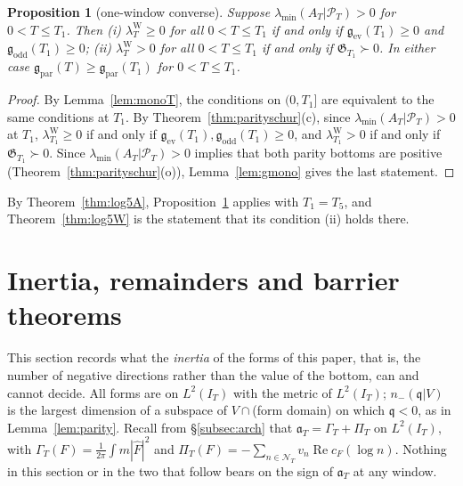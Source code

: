 \documentclass[11pt]{amsart}
\newtheorem{proposition}[theorem]{Proposition}
\theoremstyle{definition}
\theoremstyle{remark}
\newcommand{\Rel}{\operatorname{Re}}
\newcommand{\PT}{\mathcal P_T}
\newcommand{\IT}{I_T}
\newcommand{\lamW}{\lambda^{\mathrm W}_T}
\newcommand{\lamA}{\lambda_{\min}(A_T|\PT)}
\newcommand{\Fh}{\widehat F}
\newcommand{\cF}{c_F}
\newcommand{\NT}{\mathcal N_T}
\newcommand{\PiT}{\Pi_T}
\begin{document}
\begin{proposition}[one-window converse]\label{prop:onewindow}
Suppose $\lamA>0$ for $0<T\le T_1$. Then
\emph{(i)} $\lamW\ge0$ for all $0<T\le T_1$ if and only if $\mathfrak g_{\mathrm{ev}}(T_1)\ge0$ and
$\mathfrak g_{\mathrm{odd}}(T_1)\ge0$;
\emph{(ii)} $\lamW>0$ for all $0<T\le T_1$ if and only if $\mathfrak G_{T_1}\succ0$.
In either case $\mathfrak g_{\mathrm{par}}(T)\ge\mathfrak g_{\mathrm{par}}(T_1)$ for $0<T\le T_1$.
\end{proposition}
\begin{proof}
By Lemma~\ref{lem:monoT}, the conditions on $(0,T_1]$ are equivalent to the same conditions at $T_1$. By
Theorem~\ref{thm:parityschur}(c), since $\lamA>0$ at $T_1$, $\lambda^{\mathrm W}_{T_1}\ge0$ if and only if
$\mathfrak g_{\mathrm{ev}}(T_1),\mathfrak g_{\mathrm{odd}}(T_1)\ge0$, and $\lambda^{\mathrm W}_{T_1}>0$ if and only if
$\mathfrak G_{T_1}\succ0$. Since $\lamA>0$ implies that both parity bottoms are positive
(Theorem~\ref{thm:parityschur}(o)), Lemma~\ref{lem:gmono} gives the last statement.
\end{proof}

By Theorem~\ref{thm:log5A}, Proposition~\ref{prop:onewindow} applies with $T_1=T_5$, and
Theorem~\ref{thm:log5W} is the statement that its condition (ii) holds there.



\section{Inertia, remainders and barrier theorems}\label{sec:inertia}

This section records what the \emph{inertia} of the forms of this paper, that is, the number of
negative directions rather than the value of the bottom, can and cannot decide. All forms are
on $L^2(\IT)$ with the metric of $L^2(\IT)$; $n_-(\mathfrak q|V)$ is the largest dimension of a
subspace of $V\cap$(form domain) on which $\mathfrak q<0$, as in Lemma~\ref{lem:parity}. Recall from
\S\ref{subsec:arch} that $\mathfrak a_T=\Gamma_T+\PiT$ on $L^2(\IT)$, with
$\Gamma_T(F)=\frac1{2\pi}\int m|\Fh|^2$ and $\PiT(F)=-\sum_{n\in\NT}v_n\Rel\cF(\log n)$. Nothing in this
section or in the two that follow bears on the sign of $\mathfrak a_T$ at any window.
\end{document}
